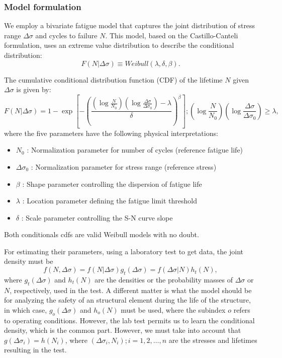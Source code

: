 \subsubsection*{Model formulation}

We employ a bivariate fatigue model that captures the joint distribution of stress range $\Delta\sigma$ and cycles to failure $N$. This model, based on the Castillo-Canteli formulation, uses an extreme value distribution to describe the conditional distribution:
\begin{equation}
F(N| \Delta\sigma) \equiv Weibull(\lambda, \delta, \beta).
\end{equation}

The cumulative conditional distribution function (CDF) of the lifetime $N$ given $\Delta \sigma$ is given by:
\begin{equation}
F(N| \Delta\sigma) = 1 - \exp\left[-\left(\frac{\left(\log\frac{N}{N_0}\right) \left(\log\frac{\Delta\sigma}{\Delta\sigma_0} \right)- \lambda}{\delta}\right)^{\beta}\right]; \left(\log\frac{N}{N_0}\right) \left(\log\frac{\Delta\sigma}{\Delta\sigma_0} \right)\geq \lambda,
\end{equation}
where the five parameters have the following physical interpretations:
\begin{itemize}
\item $N_0$ : Normalization parameter for number of cycles (reference fatigue life)
\item $\Delta\sigma_0$ : Normalization parameter for stress range (reference stress)
\item $\beta$ : Shape parameter controlling the dispersion of fatigue life
\item $\lambda$ : Location parameter defining the fatigue limit threshold
\item $\delta$ : Scale parameter controlling the S-N curve slope
\end{itemize}
Both conditionals cdfs are valid Weibull models with no doubt.

For estimating their parameters, using a laboratory test to get data, the joint density must be
 \begin{equation}
f(N, \Delta\sigma) = f(N|\Delta\sigma) g_t(\Delta\sigma) = f(\Delta\sigma|N) h_t(N),
\end{equation}
where $g_t(\Delta\sigma)$ and $h_t(N)$ are the densities or the probability masses of $\Delta\sigma$ or $N$, respectively, used in the test.
A different matter is what the model should be for analyzing the safety of an structural element during the life of the structure, in which case, $g_o(\Delta\sigma)$ and $h_o(N)$ must be used, where the subindex $o$ refers to operating conditions. However, the lab test permits us to learn the conditional density, which is the common part.
However, we must take into account that $g(\Delta\sigma_i)=h(N_i)$, where $(\Delta\sigma_i, N_i); i=1,2,\dots, n$ are the stresses and lifetimes resulting in the test.

